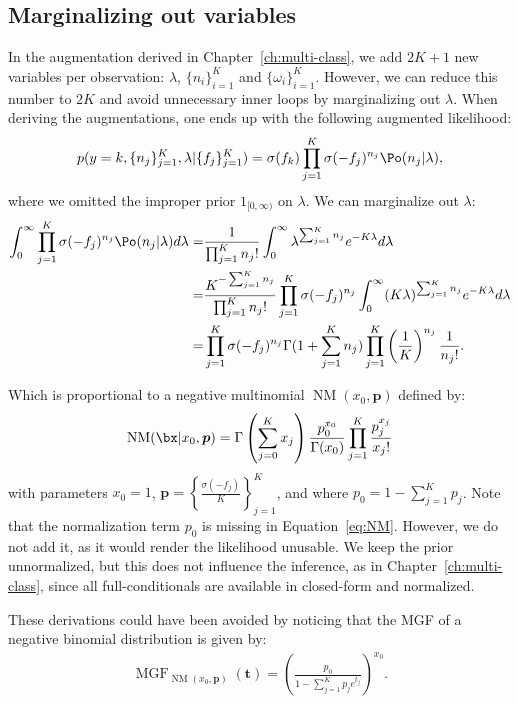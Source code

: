 \subsection{Marginalizing out variables}
\label{sec:marg_multiclass}
In the augmentation derived in Chapter~\ref{ch:multi-class}, we add $2K + 1$ new variables per observation: $\lambda$, $\{n_i\}_{i=1}^K$ and $\{\omega_i\}_{i=1}^K$.
However, we can reduce this number to $2K$ and avoid unnecessary inner loops by marginalizing out $\lambda$.
When deriving the augmentations, one ends up with the following augmented likelihood:
\begin{align}
    p(y=k, \{n_j\}_{j=1}^K, \lambda|\{f_j\}_{j=1}^K) = \sigma(f_k) \prod_{j=1}^K \sigma(-f_j)^{n_j} \Po (n_j|\lambda),
\end{align}
where we omitted the improper prior $1_{[0,\infty)}$ on $\lambda$.
We can marginalize out $\lambda$:
\begin{align}
    \int_{0}^\infty \prod_{j=1}^K \sigma(-f_j)^{n_j} \Po (n_j|\lambda)d\lambda =& \frac{1}{\prod_{j=1}^K n_j!}\int_{0}^\infty \lambda^{\sum_{j=1}^K n_j}e^{-K\lambda}d\lambda \nonumber\\
    =& \frac{K^{-\sum_{j=1}^K n_j}}{\prod_{j=1}^K n_j!}\prod_{j=1}^K \sigma(-f_j)^{n_j} \int_{0}^\infty (K\lambda)^{\sum_{j=1}^K n_j}e^{-K\lambda}d\lambda \nonumber\\
    =& \prod_{j=1}^K\sigma(-f_j)^{n_j}\Gamma(1 + \sum_{j=1}^K n_j) \prod_{j=1}^K \left(\frac{1}{K}\right)^{n_j}\frac{1}{n_j!}. \label{eq:NM}
\end{align}

Which is proportional to a negative multinomial $\operatorname{NM}(x_0, \boldsymbol{p})$ defined by:
\begin{align*}
    \operatorname{NM}(\bx|x_0,\boldsymbol{p}) = \Gamma\left(\sum_{j=0}^K x_j\right) \frac{p_0^{x_0}}{\Gamma(x_0)}\prod_{j=1}^K \frac{p_j^{x_j}}{x_j!}   
\end{align*}
with parameters $x_0=1$, $\boldsymbol{p}=\left\{\frac{\sigma(-f_j)}{K}\right\}_{j=1}^K$, and where $p_0 = 1 - \sum_{j=1}^K p_j$.
Note that the normalization term $p_0$ is missing in Equation~\eqref{eq:NM}.
However, we do not add it, as it would render the likelihood unusable.
We keep the prior unnormalized, but this does not influence the inference, as in Chapter~\ref{ch:multi-class}, since all full-conditionals are available in closed-form and normalized.

These derivations could have been avoided by noticing that the \ac{MGF} of a negative binomial distribution is given by:
\begin{align*}
    \operatorname{MGF}_{\operatorname{NM}(x_0,\boldsymbol{p})}(\boldsymbol{t}) = \left(\frac{p_0}{1-\sum_{j=1}^K p_j e^{t_j}}\right)^{x_0}.
\end{align*}


